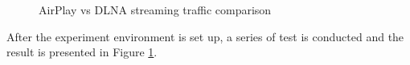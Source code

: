 \begin{figure}[hb]
\caption{AirPlay vs DLNA streaming traffic
comparison \label{airplay_vs_dlna_traffic}}
\end{figure}
\clearpage
After the experiment environment is set up, a series of test is conducted and the result is presented in Figure \ref{airplay_vs_dlna_traffic}.

